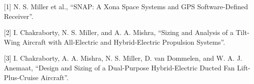 [1] N. S. Miller et al., “SNAP: A Xona Space Systems and GPS Software-Defined Receiver”.

[2] I. Chakraborty, N. S. Miller, and A. A. Mishra, “Sizing and Analysis of a Tilt-Wing Aircraft with All-Electric and Hybrid-Electric Propulsion Systems”.

[3] I. Chakraborty, A. A. Mishra, N. S. Miller, D. van Dommelen, and W. A. J. Anemaat, “Design and Sizing of a Dual-Purpose Hybrid-Electric Ducted Fan Lift-Plus-Cruise Aircraft”.


